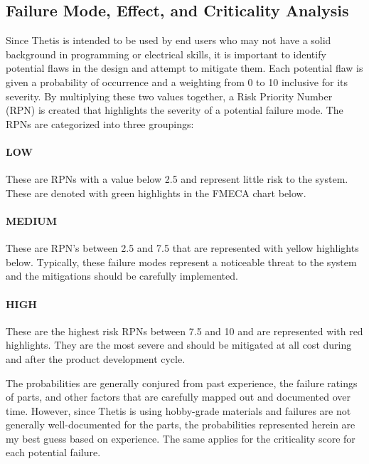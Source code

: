 \subsection{Failure Mode, Effect, and Criticality Analysis} \label{ssec:fmeca}
Since Thetis is intended to be used by end users who may not have a solid background in programming or electrical skills, it is important to identify potential flaws in the design and attempt to mitigate them.
Each potential flaw is given a probability of occurrence and a weighting from 0 to 10 inclusive for its severity. 
By multiplying these two values together, a Risk Priority Number (RPN) is created that highlights the severity of a potential failure mode. The RPNs are categorized into three groupings:

\paragraph*{LOW} These are RPNs with a value below 2.5 and represent little risk to the system. 
These are denoted with green highlights in the FMECA chart below.

\paragraph*{MEDIUM} These are RPN's between 2.5 and 7.5 that are represented with yellow highlights below.
Typically, these failure modes represent a noticeable threat to the system and the mitigations should be carefully implemented.

\paragraph*{HIGH} These are the highest risk RPNs between 7.5 and 10 and are represented with red highlights.
They are the most severe and should be mitigated at all cost during and after the product development cycle.

The probabilities are generally conjured from past experience, the failure ratings of parts, and other factors that are carefully mapped out and documented over time.
However, since Thetis is using hobby-grade materials and failures are not generally well-documented for the parts, the probabilities represented herein are my best guess based on experience.
The same applies for the criticality score for each potential failure.

